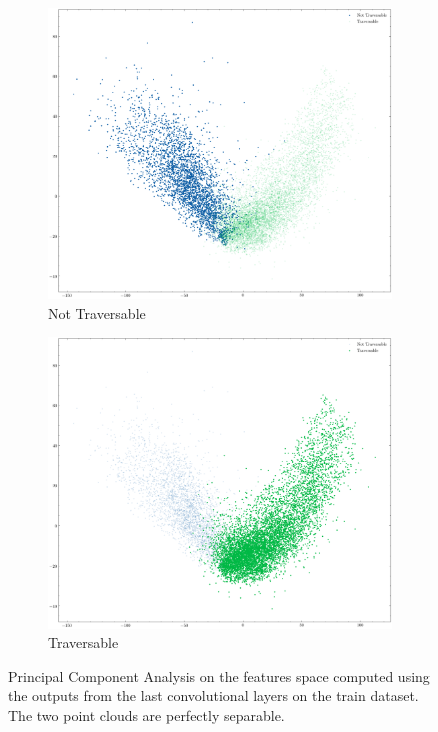 \documentclass[../document.tex]{subfiles}
\begin{document}
\begin{figure} [htbp]
\begin{subfigure}[b]{0.48\textwidth}
        \includegraphics[width=\linewidth]{../img/5/pca/pca-0.png}
        \caption{Not Traversable}
    \end{subfigure}
    \begin{subfigure}[b]{0.48\textwidth}
        \includegraphics[width=\linewidth]{../img/5/pca/pca-1.png}
        \caption{Traversable}
    \end{subfigure}
\caption{Principal Component Analysis on the features space computed using the outputs from the last convolutional layers on the train dataset. The two point clouds are perfectly separable.}
\label{fig : pca-train-set}
\end{figure}
\end{document}
